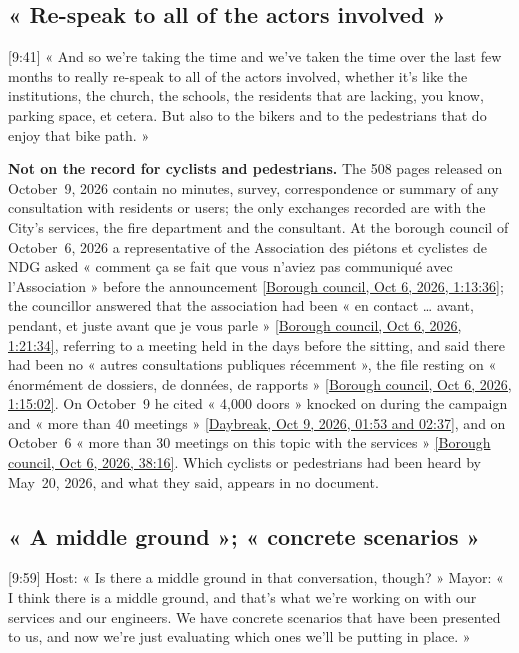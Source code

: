 \documentclass[11pt,letterpaper]{article}
\newcommand{\repourl}{https://github.com/OpenMobilityData/Terrebonne-open-sources}
\newcommand{\cliptime}[1]{\textsf{\small[#1]}}
\newcommand{\octsix}[2]{\href{\repourl/blob/main/2026-10-06-borough-council/derived/#1}{\textsf{\small[Borough council, Oct 6, 2026, #2]}}}
\newcommand{\dbocttime}[1]{\href{\repourl/blob/main/2026-cbc-daybreak-interview/}{\textsf{\small[Daybreak, Oct 9, 2026, #1]}}}
\begin{document}
\subsection{« Re-speak to all of the actors involved »}

\cliptime{9:41} « And so we're taking the time and we've taken the time
over the last few months to really re-speak to all of the actors involved,
whether it's like the institutions, the church, the schools, the residents
that are lacking, you know, parking space, et cetera. But also to the bikers
and to the pedestrians that do enjoy that bike path. »

\textbf{Not on the record for cyclists and pedestrians.} The 508 pages
released on October~9, 2026 contain no minutes, survey, correspondence or
summary of any consultation with residents or users; the only exchanges
recorded are with the City's services, the fire department and the
consultant. At the borough council of October~6, 2026 a representative of
the Association des piétons et cyclistes de NDG asked « comment ça se fait
que vous n'aviez pas communiqué avec l'Association » before the announcement
\octsix{2026-10-06_02.md}{1:13:36}; the councillor answered that the
association had been « en contact … avant, pendant, et juste avant que je
vous parle » \octsix{2026-10-06_02.md}{1:21:34}, referring to a meeting held
in the days before the sitting, and said there had been no « autres
consultations publiques récemment », the file resting on « énormément de
dossiers, de données, de rapports » \octsix{2026-10-06_02.md}{1:15:02}. On
October~9 he cited « 4,000 doors » knocked on during the campaign and
« more than 40 meetings » \dbocttime{01:53 and 02:37}, and on October~6
« more than 30 meetings on this topic with the services »
\octsix{2026-10-06_01.md}{38:16}. Which cyclists or pedestrians had been
heard by May~20, 2026, and what they said, appears in no document.

\subsection{« A middle ground »; « concrete scenarios »}

\cliptime{9:59} Host: « Is there a middle ground in that conversation,
though? » Mayor: « I think there is a middle ground, and that's what we're
working on with our services and our engineers. We have concrete scenarios
that have been presented to us, and now we're just evaluating which ones
we'll be putting in place. »
\end{document}
